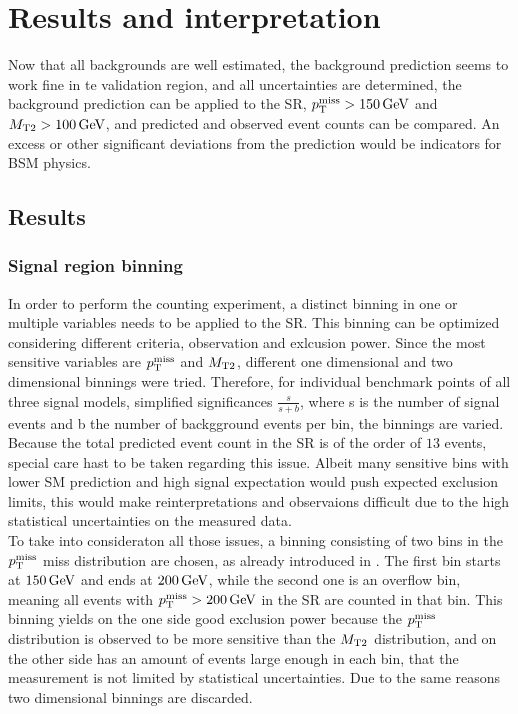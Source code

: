 \chapter{Results and interpretation}\label{chap:results}
Now that all backgrounds are well estimated, the background prediction seems to work fine in te validation region, and all uncertainties are determined, the background prediction can be applied to the SR, $p_{\mathrm{T}}^\text{miss}>150\,\text{Ge\hspace{-.08em}V}$ and $M_{\mathrm{T2}}>100\,\text{Ge\hspace{-.08em}V}$, and predicted and observed event counts can be compared. An excess or other significant deviations from the prediction would be indicators for BSM physics.
\section{Results}\label{sec:results}
\subsection*{Signal region binning}
In order to perform the counting experiment, a distinct binning in one or multiple variables needs to be applied to the SR. This binning can be optimized considering different criteria, \eg observation and exlcusion power. Since the most sensitive variables are $p_{\mathrm{T}}^\text{miss}$ and $M_{\mathrm{T2}}$, different one dimensional and two dimensional binnings were tried. Therefore, for individual benchmark points of all three signal models, simplified significances $\frac{s}{s+b}$, where s is the number of signal events and b the number of backgground events per bin, the binnings are varied. Because the total predicted event count in the SR is of the order of $13$ events, special care hast to be taken regarding this issue. Albeit many sensitive bins with lower SM prediction and high signal expectation would push expected exclusion limits, this would make reinterpretations and observaions difficult due to the high statistical uncertainties on the measured data.\\
To take into consideraton all those issues, a binning consisting of two bins in the $p_{\mathrm{T}}^\text{miss}$ miss distribution are chosen, as already introduced in . The first bin starts at $150\,\text{Ge\hspace{-.08em}V}$ and ends at $200\,\text{Ge\hspace{-.08em}V}$, while the second one is an overflow bin, meaning all events with $p_{\mathrm{T}}^\text{miss}>200\,\text{Ge\hspace{-.08em}V}$ in the SR are counted in that bin. This binning yields on the one side good exclusion power because the $p_{\mathrm{T}}^\text{miss}$ distribution is observed to be more sensitive than the $M_{\mathrm{T2}}$ distribution, and on the other side has an amount of events large enough in each bin, that the measurement is not limited by statistical uncertainties. Due to the same reasons two dimensional binnings are discarded.
